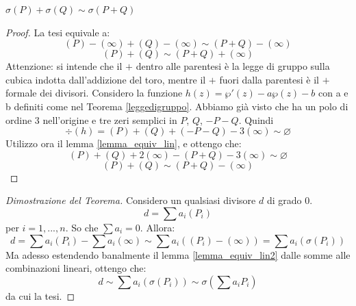 \begin{lemma}
  \label{lemma_equiv_lin2}
$\sigma(P)+\sigma(Q) \sim \sigma (P+Q)$
\end{lemma}
\begin{proof}
La tesi equivale a:
$$(P)-(\infty)+(Q)-(\infty) \sim (P+Q)-(\infty)$$
$$(P)+(Q)\sim (P+Q)+(\infty)$$
Attenzione: si intende che il $+$ dentro alle parentesi è la legge di gruppo sulla cubica indotta dall'addizione del toro, mentre il $+$ fuori dalla parentesi è il $+$ formale dei divisori.
Considero la funzione $h(z) = \wp'(z) - a \wp(z) - b$ con a e b definiti come nel Teorema \ref{leggedigruppo}. Abbiamo già visto che ha un polo di ordine $3$ nell'origine e tre zeri semplici in $P$, $Q$, $-P-Q$. Quindi $$\div(h)=(P)+(Q)+(-P-Q)-3(\infty) \sim \varnothing$$
Utilizzo ora il lemma \ref{lemma_equiv_lin}, e ottengo che:
$$(P)+(Q)+2(\infty)-(P+Q)-3(\infty) \sim \varnothing$$
$$(P)+(Q) \sim (P+Q)-(\infty)$$
\end{proof}

\begin{proof}[Dimostrazione del Teorema]
Considero un qualsiasi divisore $d$ di grado $0$.
$$d=\sum a_i (P_i)$$
per $i=1,...,n$. So che $\sum a_i=0$. Allora:
$$d = \sum a_i (P_i)-\sum a_i (\infty) \sim \sum a_i ((P_i)-(\infty))=\sum a_i (\sigma(P_i))$$
Ma adesso estendendo banalmente il lemma \ref{lemma_equiv_lin2} dalle somme alle combinazioni lineari, ottengo che:
$$d \sim \sum a_i (\sigma(P_i)) \sim \sigma(\sum a_i P_i)$$
da cui la tesi.
\end{proof}

